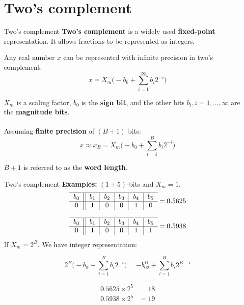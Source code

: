 \documentclass[10pt, handout]{beamer}
\begin{document}
%
\section{Two's complement}
\begin{frame}{Two's complement}
\textbf{Two's complement} is a widely used \textbf{fixed-point} representation. It allows fractions to be represented as integers.

Any real number $x$ can be represented with infinite precision in two's complement:
\begin{equation*}
x = X_m\bigg(-b_0 + \sum_{i=1}^{\infty}b_i2^{-i}\bigg) \tag{infinite precision}
\end{equation*}

$X_m$ is a scaling factor, $b_0$ is the \textbf{sign bit}, and the other bits $b_i, i = 1, \ldots, \infty$ are the \textbf{magnitude bits}.
~\\
~\\

\pause
Assuming \textbf{finite precision} of $(B+1)$ bits: 
\begin{equation}
x \approx x_B=  X_m\bigg(-b_0 + \sum_{i=1}^{B}b_i2^{-i}\bigg) \tag{$B+1$ bits precision}
\end{equation}

$B+1$ is referred to as the \textbf{word length}.
\end{frame}

%
\begin{frame}{Two's complement}
\textbf{Examples:} $(1+5)$-bits and $X_m = 1$. 
\begin{equation*}
\begin{tabular}{c||c|c|c|c|c}
\hline
$b_0$ & $b_1$ & $b_2$ & $b_3$ & $b_4$ & $b_5$ \\
\hline
$0$ & $1$ & $0$ & $0$ & $1$ & $0$ \\
\hline
\end{tabular} = 0.5625
\end{equation*}

\begin{equation*}
	\begin{tabular}{c||c|c|c|c|c}
	\hline
	$b_0$ & $b_1$ & $b_2$ & $b_3$ & $b_4$ & $b_5$ \\
	\hline
	$0$ & $1$ & $0$ & $0$ & $1$ & $1$ \\
	\hline
	\end{tabular} = 0.5938
\end{equation*}
If $X_m = 2^B$. We have integer representation:  

\begin{equation*}
	2^B\bigg(-b_0 + \sum_{i=1}^{B}b_i2^{-i}\bigg) = -b_02^B + \sum_{i=1}^{B}b_i2^{B-i}
\end{equation*}

\begin{align*}
	0.5625\times 2^5 &= 18 \\
	0.5938\times 2^5 &= 19
\end{align*}
\end{frame}
\end{document}
